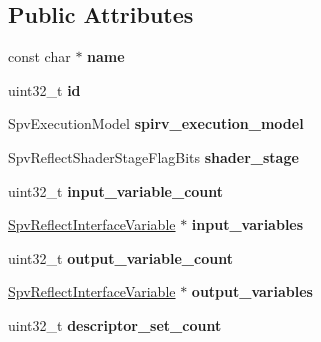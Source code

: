 \subsection*{Public Attributes}
\begin{DoxyCompactItemize}
\item 
\mbox{\label{structSpvReflectEntryPoint_a45f89711a52ac9852c67bd27da37c044}} 
const char $\ast$ {\bfseries name}
\item 
\mbox{\label{structSpvReflectEntryPoint_acfec332105eb549c66743c6304d1e930}} 
uint32\+\_\+t {\bfseries id}
\item 
\mbox{\label{structSpvReflectEntryPoint_a841d0cec375989f2bbdc71d9eb5beee3}} 
Spv\+Execution\+Model {\bfseries spirv\+\_\+execution\+\_\+model}
\item 
\mbox{\label{structSpvReflectEntryPoint_add5ca4c1020fcca7ba8d222e29426ad4}} 
Spv\+Reflect\+Shader\+Stage\+Flag\+Bits {\bfseries shader\+\_\+stage}
\item 
\mbox{\label{structSpvReflectEntryPoint_a153e1ff16729649da0986cf748a7b28c}} 
uint32\+\_\+t {\bfseries input\+\_\+variable\+\_\+count}
\item 
\mbox{\label{structSpvReflectEntryPoint_afbd2406ed98067974bfb6029b0babbc2}} 
\hyperlink{structSpvReflectInterfaceVariable}{Spv\+Reflect\+Interface\+Variable} $\ast$ {\bfseries input\+\_\+variables}
\item 
\mbox{\label{structSpvReflectEntryPoint_a810df0b74c32598955669d463f735cf1}} 
uint32\+\_\+t {\bfseries output\+\_\+variable\+\_\+count}
\item 
\mbox{\label{structSpvReflectEntryPoint_a757348c742fd4a8335a6f5b534a9590f}} 
\hyperlink{structSpvReflectInterfaceVariable}{Spv\+Reflect\+Interface\+Variable} $\ast$ {\bfseries output\+\_\+variables}
\item 
\mbox{\label{structSpvReflectEntryPoint_acf4c8e423dcb9311130ec470c87af948}} 
uint32\+\_\+t {\bfseries descriptor\+\_\+set\+\_\+count}

\end{DoxyCompactItemize}
